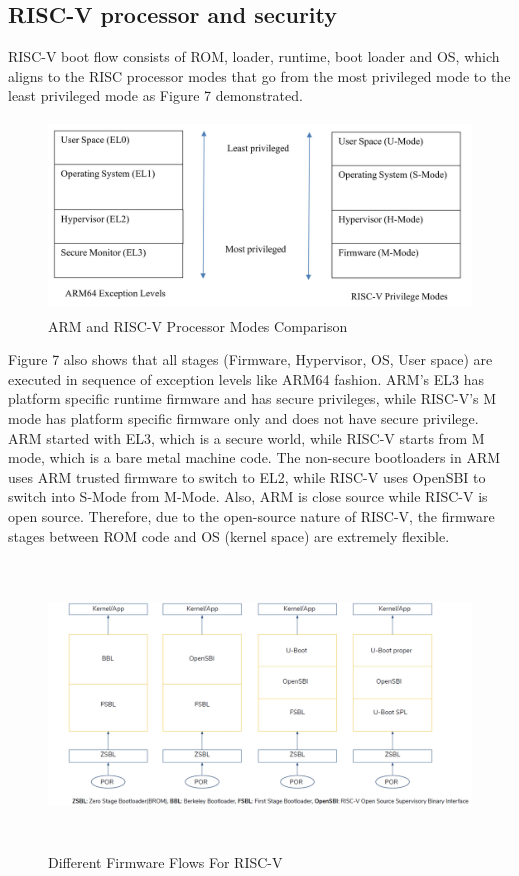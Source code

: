 \documentclass[review]{elsarticle}
\begin{document}
\subsection{ RISC-V processor and security}
RISC-V boot flow consists of ROM, loader, runtime, boot loader and OS, which aligns to the RISC processor modes that go from the most privileged mode to the least privileged mode as Figure 7 demonstrated. 

\begin{figure}[H]
	\centering
	\includegraphics[width=1\textwidth,height=2in]{figs/ArmAndRiscVProcessorModesComparison.JPG}
	\caption{ARM and RISC-V Processor Modes Comparison}
\end{figure}

Figure 7 also shows that all stages (Firmware, Hypervisor, OS, User space) are executed in sequence of exception levels like ARM64 fashion. ARM’s EL3 has platform specific runtime firmware and has secure privileges, while RISC-V’s M mode has platform specific firmware only and does not have secure privilege. ARM started with EL3, which is a secure world, while RISC-V starts from M mode, which is a bare metal machine code. The non-secure bootloaders in ARM uses ARM trusted firmware to switch to EL2, while RISC-V uses OpenSBI to switch into S-Mode from M-Mode. Also, ARM is close source while RISC-V is open source. Therefore, due to the open-source nature of RISC-V, the firmware stages between ROM code and OS (kernel space) are extremely flexible.

\begin{figure}[H]
	\centering
	\includegraphics[width=1\textwidth,height=3in]{figs/DifferentFirmwareFlowsForRiscV.JPG}
	\caption{Different Firmware Flows For RISC-V \cite{R51:1}}
\end{figure}
\end{document}
